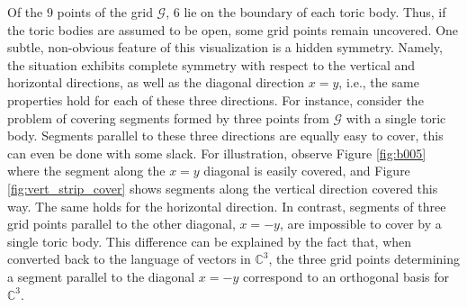 \documentclass[12pt, a4paper]{article}
\theoremstyle{plain} %
\theoremstyle{definition} %
\theoremstyle{remark} %
\begin{document}

Of the $9$ points of the grid $\mathcal{G}$, $6$ lie on the boundary of each toric body. Thus, if the toric bodies are assumed to be open, some grid points remain uncovered. One subtle, non-obvious feature of this visualization is a hidden symmetry. Namely, the situation exhibits complete symmetry with respect to the vertical and horizontal directions, as well as the diagonal direction $x=y$, i.e., the same properties hold for each of these three directions. For instance, consider the problem of covering segments formed by three points from $\mathcal{G}$ with a single toric body. Segments parallel to these three directions are equally easy to cover, this can even be done with some slack. For illustration, observe Figure \ref{fig:b005} where the segment along the $x=y$ diagonal is easily covered, and Figure \ref{fig:vert_strip_cover} shows segments along the vertical direction covered this way. The same holds for the horizontal direction. In contrast, segments of three grid points parallel to the other diagonal, $x=-y$, are impossible to cover by a single toric body. This difference can be explained by the fact that, when converted back to the language of vectors in $\mathbb{C}^3$, the three grid points determining a segment parallel to the diagonal $x=-y$ correspond to an orthogonal basis for $\mathbb{C}^3$.

\end{document}
